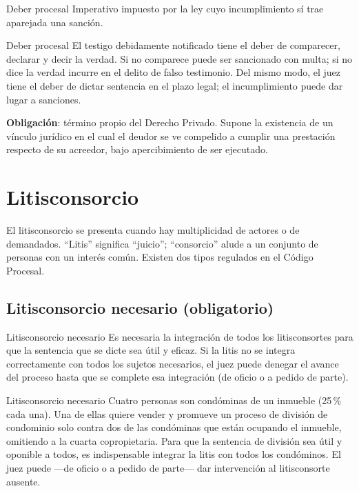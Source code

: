 \documentclass[12pt,oneside]{book}
\begin{document}
\begin{definition}{Deber procesal}
Imperativo impuesto por la ley cuyo incumplimiento sí trae aparejada una sanción.
\end{definition}

\begin{example}{Deber procesal}
El testigo debidamente notificado tiene el deber de comparecer, declarar y decir la verdad. Si no comparece puede ser sancionado con multa; si no dice la verdad incurre en el delito de falso testimonio. Del mismo modo, el juez tiene el deber de dictar sentencia en el plazo legal; el incumplimiento puede dar lugar a sanciones.
\end{example}

\textbf{Obligación}: término propio del Derecho Privado. Supone la existencia de un vínculo jurídico en el cual el deudor se ve compelido a cumplir una prestación respecto de su acreedor, bajo apercibimiento de ser ejecutado.

\section{Litisconsorcio}

El litisconsorcio se presenta cuando hay multiplicidad de actores o de demandados. ``Litis'' significa ``juicio''; ``consorcio'' alude a un conjunto de personas con un interés común. Existen dos tipos regulados en el Código Procesal.

\subsection{Litisconsorcio necesario (obligatorio)}

\begin{definition}{Litisconsorcio necesario}
Es necesaria la integración de todos los litisconsortes para que la sentencia que se dicte sea útil y eficaz. Si la litis no se integra correctamente con todos los sujetos necesarios, el juez puede denegar el avance del proceso hasta que se complete esa integración (de oficio o a pedido de parte).
\end{definition}

\begin{example}{Litisconsorcio necesario}
Cuatro personas son condóminas de un inmueble (25\,\% cada una). Una de ellas quiere vender y promueve un proceso de división de condominio solo contra dos de las condóminas que están ocupando el inmueble, omitiendo a la cuarta copropietaria. Para que la sentencia de división sea útil y oponible a todos, es indispensable integrar la litis con todos los condóminos. El juez puede —de oficio o a pedido de parte— dar intervención al litisconsorte ausente.
\end{example}
\end{document}
